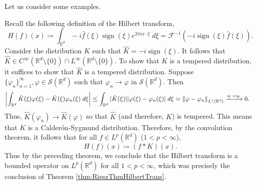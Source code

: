\documentclass{article}
\begin{document}
Let us consider some examples. 

\begin{example}
	Recall the following definition of the Hilbert transform, 
	\begin{equation*}
		H(f)(x) \coloneqq \int_{\mathbb{R}^{d}}-i\hat{f}(\xi)\operatorname{sign}(\xi)e^{2\pi i x \cdot \xi}\;d\xi = \mathcal{F}^{-1}(-i\operatorname{sign}(\xi)\hat{f}(\xi)). 
	\end{equation*} 
	Consider the distribution $K$ such that $\hat{K} = -i\operatorname{sign}(\xi)$. It follows that $\hat{K} \in C^{\infty}(\mathbb{R}^{d}\setminus \{0\}) \cap L^{\infty}(\mathbb{R}^{d}\setminus \{0\})$. To show that $K$ is a tempered distribution, it suffices to show that $\hat{K}$ is a tempered distribution. Suppose $\{\varphi_{n}\}_{n = 1}^{\infty}, \varphi \in \mathcal{S}(\mathbb{R}^{d})$ such that $\varphi_{n} \to \varphi$ in $\mathcal{S}(\mathbb{R}^{d})$. Then
	\begin{align*}
		\begin{split}
			\left| \int_{\mathbb{R}^{d}}\hat{K}(\xi)\varphi(\xi) - \hat{K}(\xi)\varphi_{n}(\xi)\;d\xi \right| &\leq \int_{\mathbb{R}^{d}}|\hat{K}(\xi)||\varphi(\xi) - \varphi_{n}(\xi)|\;d\xi = \left\Vert \varphi - \varphi_{n} \right\Vert_{L^{1}(\mathbb{R}^{d})}\xrightarrow{n \to \infty} 0. 
		\end{split} 
	\end{align*} 
	Thus, $\hat{K}(\varphi_{n}) \to \hat{K}(\varphi)$ so that $\hat{K}$ (and therefore, $K$) is tempered. This means that $K$ is a Calder\'on-Sygmund distribution. Therefore, by the convolution theorem, it follows that for all $f \in L^{p}(\mathbb{R}^{d})$ ($1 < p < \infty$), 
	\begin{equation*}
		H(f)(x) \coloneqq (f \ast K)(x). 
	\end{equation*}
	Thus by the preceding theorem, we conclude that the Hilbert transform is a bounded operator on $L^{p}(\mathbb{R}^{d})$ for all $1 < p < \infty$, which was precisely the conclusion of Theorem \ref{thm:RieszThmHilbertTrans}. 
\end{example} 
\end{document}
